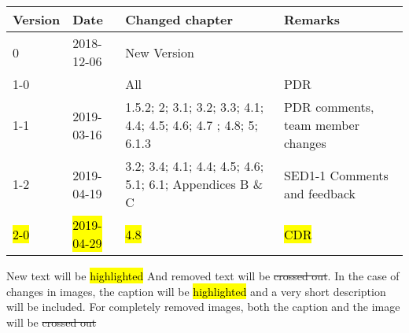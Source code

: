 \begin{longtable}{|p{1.5cm}|p{2cm}|p{6cm}|p{3cm}|}\hline
\centering
\textbf{Version} & \textbf{Date} & \textbf{Changed chapter} & \textbf{Remarks}  \\\hline
0       & 2018-12-06 	& New Version 	&          				\\\hline
1-0   	&  				& All         	& PDR      				\\\hline

1-1		& 2019-03-16	& 1.5.2; 2; 3.1; 3.2; 3.3; 4.1; 4.4; 4.5; 4.6; 4.7 ; 4.8; 5; 6.1.3		& PDR comments, team member changes 			\\\hline
1-2		& 2019-04-19 	& 3.2; 3.4; 4.1; 4.4; 4.5; 4.6; 5.1; 6.1; Appendices B \& C 			& SED1-1 Comments and feedback \\\hline
\hl{2-0} & \hl{2019-04-29} & \hl{4.8}																& \hl{CDR} \\\hline

\end{longtable}       

New text will be \hl{highlighted} And removed text will be \st{crossed out}. In the case of changes in images, the caption will be \hl{highlighted} and a very short description will be included. For completely removed images, both the caption and the image will be \st{crossed out} 